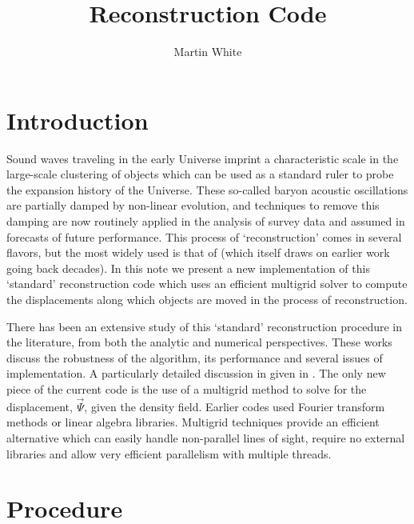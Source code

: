 \documentclass[a4paper,11pt]{article}
\author[a,b]{Martin White}
\affiliation[a]{Department of Physics, University of California,
Berkeley, CA}
\affiliation[b]{Lawrence Berkeley Laboratory, 1 Cyclotron Road,
Berkeley, CA}
\title{Reconstruction Code}
\begin{document}
\maketitle
\flushbottom

\section{Introduction}
\label{sec:intro}

Sound waves traveling in the early Universe imprint a characteristic
scale in the large-scale clustering of objects which can be used as a
standard ruler to probe the expansion history of the Universe.  These
so-called baryon acoustic oscillations are partially damped by
non-linear evolution, and techniques to remove this damping are now
routinely applied in the analysis of survey data and assumed in
forecasts of future performance.  This process of `reconstruction'
comes in several flavors, but the most widely used is that of
\cite{Eis07} (which itself draws on earlier work going back decades).
In this note we present a new implementation of this `standard'
reconstruction code which uses an efficient multigrid solver to
compute the displacements along which objects are moved in the process
of reconstruction.

There has been an extensive study of this `standard' reconstruction procedure
in the literature, from both the analytic \cite{PWC09,NWP09,TasZal12,ZelRecon}
and numerical \cite{Seo10,Pad12,Xu13,Bur14,Toj14,Var14,Bur15} perspectives.
These works discuss the robustness of the algorithm, its performance and
several issues of implementation.
A particularly detailed discussion in given in \cite{Pad12,Bur14,Bur15}.
The only new piece of the current code is the use of a multigrid method to
solve for the displacement, $\vec{\Psi}$, given the density field.  Earlier
codes used Fourier transform methods or linear algebra libraries.  Multigrid
techniques provide an efficient alternative which can easily handle
non-parallel lines of sight, require no external libraries and allow very
efficient parallelism with multiple threads.

\section{Procedure}
\end{document}
